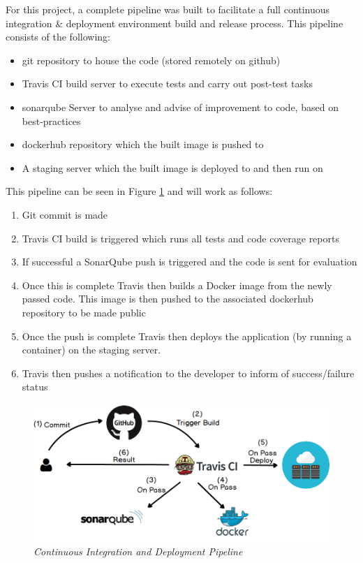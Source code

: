 For this project, a complete pipeline was built to facilitate a full continuous integration \& deployment environment build and release process. This pipeline consists of the following:

\begin{itemize}
	\item \gls{git} repository to house the code (stored remotely on \gls{github})
	\item \gls{Travis} CI build server to execute tests and carry out post-test tasks
	\item \gls{sonarqube} Server to analyse and advise of improvement to code, based on best-practices
	\item \gls{dockerhub} repository which the built image is pushed to
	\item A \gls{staging server} which the built image is deployed to and then run on
\end{itemize}

This pipeline can be seen in Figure \ref{fig:CICD} and will work as follows:

\begin{enumerate}
	\item Git commit is made
	\item Travis CI build is triggered which runs all tests and \gls{code coverage} reports
	\item If successful a SonarQube push is triggered and the code is sent for evaluation
	\item Once this is complete Travis then builds a \gls{Docker image} from the newly passed code. This image is then pushed to the associated \gls{dockerhub} repository to be made public
	\item Once the push is complete Travis then deploys the application (by running a container) on the \gls{staging server}.
	\item Travis then pushes a notification to the developer to inform of success/failure status
\end{enumerate}

\begin{figure}[!ht]
\centering
\includegraphics*[width=\textwidth]{images/CI_CD}
\caption{\em Continuous Integration and Deployment Pipeline}
\label{fig:CICD}
\end{figure}

